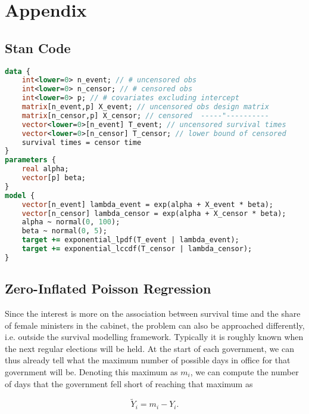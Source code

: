 \section{Appendix}

\setcounter{table}{0}
\renewcommand{\thetable}{A\arabic{table}}
\setcounter{figure}{0}
\renewcommand{\thefigure}{A\arabic{figure}}


\subsection{Stan Code}
\begin{lstlisting}[language=Stan, caption = {Stan Model Code}, captionpos = t, label = {code:stan}]
data {
    int<lower=0> n_event; // # uncensored obs         
    int<lower=0> n_censor; // # censored obs
    int<lower=0> p; // # covariates excluding intercept
    matrix[n_event,p] X_event; // uncensored obs design matrix 
    matrix[n_censor,p] X_censor; // censored  -----"----------
    vector<lower=0>[n_event] T_event; // uncensored survival times
    vector<lower=0>[n_censor] T_censor; // lower bound of censored
    survival times = censor time                  
}
parameters {
    real alpha;
    vector[p] beta;                                     
}
model {
    vector[n_event] lambda_event = exp(alpha + X_event * beta);
    vector[n_censor] lambda_censor = exp(alpha + X_censor * beta);
    alpha ~ normal(0, 100);
    beta ~ normal(0, 5);
    target += exponential_lpdf(T_event | lambda_event); 
    target += exponential_lccdf(T_censor | lambda_censor);  
}
\end{lstlisting}


\subsection{Zero-Inflated Poisson Regression}
Since the interest is more on the association between survival time and the share of female ministers in the cabinet, the problem can also be approached differently, i.e. outside the survival modelling framework. Typically it is roughly known when the next regular elections will be held. At the start of each government, we can thus already tell what the maximum number of possible days in office for that government will be. Denoting this maximum as $m_i$, we can compute the number of days that the government fell short of reaching that maximum as 

\begin{equation*}
    \widetilde{Y}_i = m_i - Y_i.
\end{equation*}

